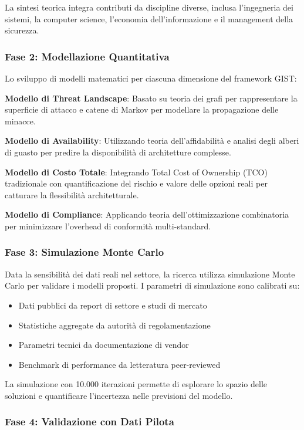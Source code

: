 La sintesi teorica integra contributi da discipline diverse, inclusa l'ingegneria dei sistemi, la computer science, l'economia dell'informazione e il management della sicurezza.

\subsubsection{Fase 2: Modellazione Quantitativa}

Lo sviluppo di modelli matematici per ciascuna dimensione del framework GIST:

\textbf{Modello di Threat Landscape}: Basato su teoria dei grafi per rappresentare la superficie di attacco e catene di Markov per modellare la propagazione delle minacce.

\textbf{Modello di Availability}: Utilizzando teoria dell'affidabilità e analisi degli alberi di guasto per predire la disponibilità di architetture complesse.

\textbf{Modello di Costo Totale}: Integrando Total Cost of Ownership (TCO) tradizionale con quantificazione del rischio e valore delle opzioni reali per catturare la flessibilità architetturale.

\textbf{Modello di Compliance}: Applicando teoria dell'ottimizzazione combinatoria per minimizzare l'overhead di conformità multi-standard.

\subsubsection{Fase 3: Simulazione Monte Carlo}

Data la sensibilità dei dati reali nel settore, la ricerca utilizza simulazione Monte Carlo per validare i modelli proposti. I parametri di simulazione sono calibrati su:
\begin{itemize}
\item Dati pubblici da report di settore e studi di mercato
\item Statistiche aggregate da autorità di regolamentazione
\item Parametri tecnici da documentazione di vendor
\item Benchmark di performance da letteratura peer-reviewed
\end{itemize}

La simulazione con 10.000 iterazioni permette di esplorare lo spazio delle soluzioni e quantificare l'incertezza nelle previsioni del modello.

\subsubsection{Fase 4: Validazione con Dati Pilota}

